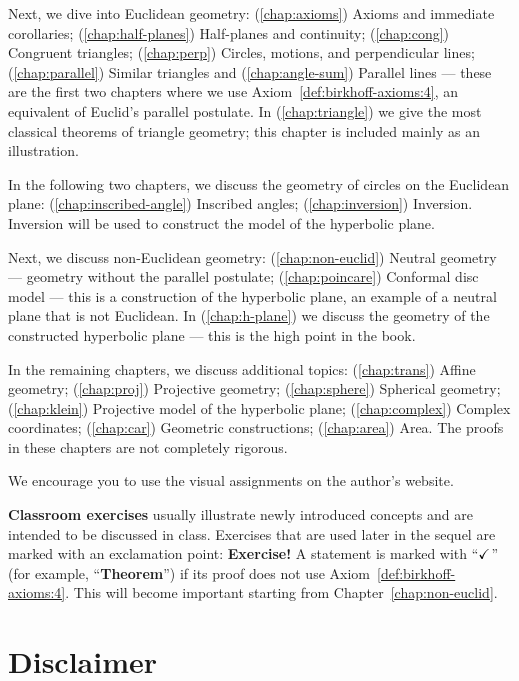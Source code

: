 Next, we dive into Euclidean geometry:
(\ref{chap:axioms}) Axioms and immediate corollaries;
(\ref{chap:half-planes}) Half-planes and continuity;
(\ref{chap:cong}) Congruent triangles;
(\ref{chap:perp}) Circles, motions, and perpendicular lines;
(\ref{chap:parallel}) Similar triangles and (\ref{chap:angle-sum}) Parallel lines  
--- these are the first two chapters where we use Axiom~\ref{def:birkhoff-axioms:4}, an equivalent of Euclid's parallel postulate.
In (\ref{chap:triangle}) we give the most classical theorems of triangle geometry;
this chapter is included mainly as an illustration.

In the following two chapters, we discuss the geometry of circles on the Euclidean plane:
(\ref{chap:inscribed-angle}) Inscribed angles; (\ref{chap:inversion}) Inversion.
Inversion will be used to construct the model of the hyperbolic plane.

Next, we discuss non-Euclidean geometry:
(\ref{chap:non-euclid})
Neutral geometry --- geometry without the parallel postulate;
(\ref{chap:poincare})
Conformal disc model ---
this is a construction of the hyperbolic plane,
an example of a neutral plane that is not Euclidean.
In (\ref{chap:h-plane}) we discuss the geometry of the constructed hyperbolic plane --- this is the high point in the book.

In the remaining chapters, we discuss additional topics:
(\ref{chap:trans}) Affine geometry;
(\ref{chap:proj}) Projective geometry;
(\ref{chap:sphere}) Spherical geometry;
(\ref{chap:klein}) Projective model of the hyperbolic plane;
(\ref{chap:complex}) Complex coordinates;
(\ref{chap:car}) Geometric constructions;
(\ref{chap:area}) Area.
The proofs in these chapters are not completely rigorous.

We encourage you to use the visual assignments on the author's website.

\textbf{Classroom exercises} usually illustrate newly introduced concepts and are intended to be discussed in class.
Exercises that are used later in the sequel are marked with an exclamation point: \textbf{Exercise!}
A statement is marked with ``$\checkmark$''\label{a-mark} (for example, ``\textbf{Theorem\abs}'') if its proof does not use Axiom~\ref{def:birkhoff-axioms:4}.
This will become important starting from Chapter~\ref{chap:non-euclid}.


\section{Disclaimer}
 
